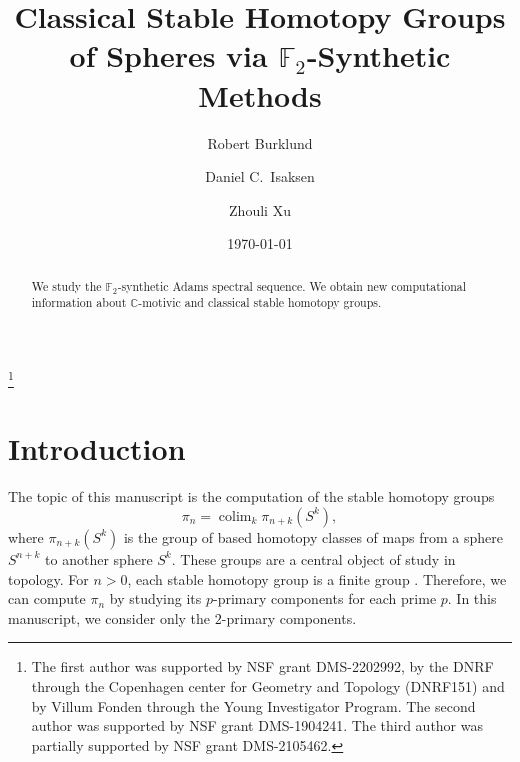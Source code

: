 \documentclass{amsart}
\theoremstyle{definition}
\newcommand{\C}{\mathbb{C}}
\newcommand{\F}{\mathbb{F}}
\DeclareMathOperator{\colim}{colim}
\begin{document}
\title[$\F_2$-synthetic methods]
{Classical Stable Homotopy Groups of Spheres via $\F_2$-Synthetic Methods}

\author{Robert Burklund}
\address{Department of Mathematical Sciences, University of Copenhagen, Denmark}

\author{Daniel C.\ Isaksen}
\address{Department of Mathematics\\
Wayne State University\\
Detroit, MI 48202, USA}

\author{Zhouli Xu}
\address{Department of Mathematics, UC San Diego, La Jolla, CA 92093, USA}

\thanks{
The first author was supported by NSF grant DMS-2202992, by the DNRF through the Copenhagen center for Geometry and Topology (DNRF151) and by Villum Fonden through the Young Investigator Program.
The second author was supported by NSF grant DMS-1904241.
The third author was partially supported by NSF grant DMS-2105462.}





\date{\today}

\begin{abstract}
We study the $\F_2$-synthetic Adams spectral sequence.  We
obtain new computational information about $\C$-motivic and classical
stable homotopy groups.
\end{abstract}

\maketitle

\section{Introduction}
\label{sctn:intro}

The topic of this manuscript is the computation of the 
stable homotopy groups 
\[
\pi_n = \colim_k \pi_{n+k}(S^k),
\]
where $\pi_{n+k}(S^k)$ is the group of based homotopy classes
of maps from a sphere $S^{n+k}$ to another sphere $S^k$.
These groups are a central object of study in topology.
For $n > 0$, each stable homotopy group is a finite group \cite{Serre53}.
Therefore, we can compute $\pi_n$ by studying its $p$-primary components
for each prime $p$.  In this manuscript, we consider only the
$2$-primary components.
\end{document}
